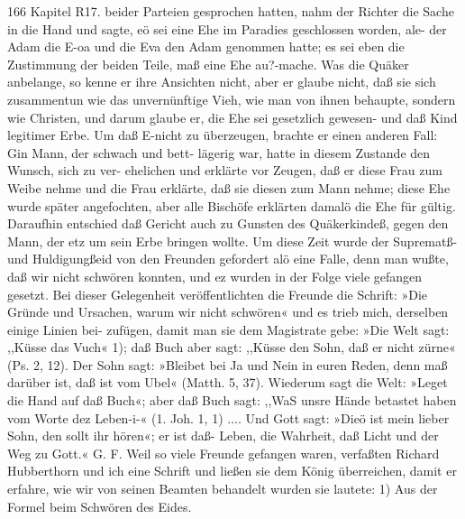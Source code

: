 166 Kapitel R17.
beider Parteien gesprochen hatten, nahm der Richter die Sache
in die Hand und sagte, eö sei eine Ehe im Paradies geschlossen
worden, ale- der Adam die E-oa und die Eva den Adam genommen
hatte; es sei eben die Zustimmung der beiden Teile, maß eine
Ehe au?-mache. Was die Quäker anbelange, so kenne er ihre
Ansichten nicht, aber er glaube nicht, daß sie sich zusammentun
wie das unvernünftige Vieh, wie man von ihnen behaupte, sondern
wie Christen, und darum glaube er, die Ehe sei gesetzlich gewesen-
und daß Kind legitimer Erbe. Um daß E-nicht zu überzeugen,
brachte er einen anderen Fall: Gin Mann, der schwach und bett-
lägerig war, hatte in diesem Zustande den Wunsch, sich zu ver-
ehelichen und erklärte vor Zeugen, daß er diese Frau zum
Weibe nehme und die Frau erklärte, daß sie diesen zum Mann
nehme; diese Ehe wurde später angefochten, aber alle Bischöfe
erklärten damalö die Ehe für gültig. Daraufhin entschied daß
Gericht auch zu Gunsten des Quäkerkindeß, gegen den Mann,
der etz um sein Erbe bringen wollte.
Um diese Zeit wurde der Suprematß- und Huldigungßeid
von den Freunden gefordert alö eine Falle, denn man wußte,
daß wir nicht schwören konnten, und ez wurden in der Folge
viele gefangen gesetzt. Bei dieser Gelegenheit veröffentlichten
die Freunde die Schrift: »Die Gründe und Ursachen, warum wir
nicht schwören« und es trieb mich, derselben einige Linien bei-
zufügen, damit man sie dem Magistrate gebe:
»Die Welt sagt: ,,Küsse das Vuch« 1); daß Buch aber sagt:
,,Küsse den Sohn, daß er nicht zürne« (Ps. 2, 12). Der Sohn sagt:
»Bleibet bei Ja und Nein in euren Reden, denn maß darüber ist,
daß ist vom Ubel« (Matth. 5, 37). Wiederum sagt die Welt: »Leget
die Hand auf daß Buch«; aber daß Buch sagt: ,,WaS unsre Hände
betastet haben vom Worte dez Leben-i-« (1. Joh. 1, 1) .... Und
Gott sagt: »Dieö ist mein lieber Sohn, den sollt ihr hören«;
er ist daß- Leben, die Wahrheit, daß Licht und der Weg zu Gott.«
G. F.
Weil so viele Freunde gefangen waren, verfaßten Richard
Hubberthorn und ich eine Schrift und ließen sie dem König überreichen,
damit er erfahre, wie wir von seinen Beamten behandelt wurden
sie lautete:
1) Aus der Formel beim Schwören des Eides.


